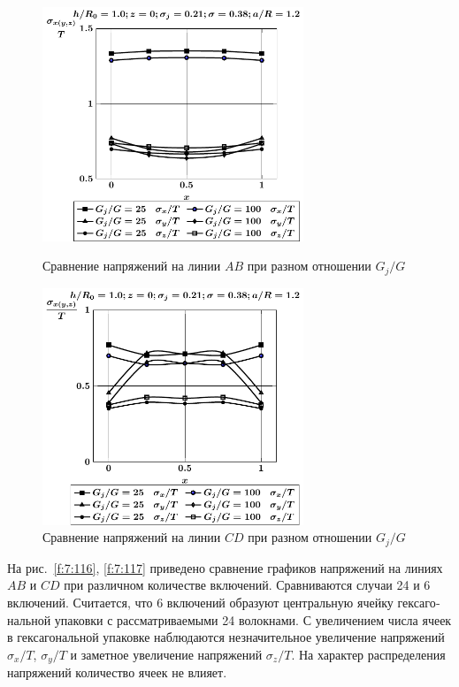 \begin{russian}
\begin{figure}[h!]
\centering\footnotesize
\parbox[b]{7.5cm}{\centering\includegraphics[width=7.8cm]{inc24-g-a12-h10-r10-z0.pdf}
\caption{Сравнение напряжений на линии $AB$ при разном отношении $G_j/G$
\label{f:7:114}}}\hfil\hfil
\parbox[b]{7.5cm}{\centering\includegraphics[width=7.8cm]{inc24-g-a12-h10-r10-z0-diag.pdf}
\caption{Сравнение напряжений на линии $CD$ при разном отношении $G_j/G$
\label{f:7:115}}}
\end{figure}

На рис.~\ref{f:7:116}, \ref{f:7:117} приведено сравнение графиков напряжений на линиях $AB$ и $CD$ при различном количестве включений. Сравниваются случаи 24 и 6 включений. Считается, что 6 включений образуют центральную ячейку гексагональной упаковки с рассматриваемыми 24 волокнами. С увеличением числа ячеек в гексагональной упаковке наблюдаются незначительное увеличение напряжений $\sigma_x/T$, $\sigma_y/T$ и заметное увеличение напряжений $\sigma_z/T$. На характер распределения напряжений количество ячеек не влияет.


\end{russian}
